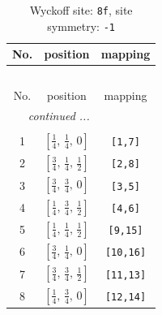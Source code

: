 \documentclass[fleqn,8pt]{jsarticle}
\begin{document}
\begin{longtable}{ccc}
\caption{Wyckoff site: {\tt 8f}, site symmetry: {\tt -1}}
 \\
 \hline \hline
No. & position & mapping \\ \hline \endfirsthead

\multicolumn{2}{l}{\tablename\ \thetable{}} \\
 \hline \hline
No. & position & mapping \\ \hline \endhead

 \hline \hline
\multicolumn{2}{r}{\footnotesize\it continued ...} \\ \endfoot

 \hline \hline
\multicolumn{2}{r}{} \\ \endlastfoot

1 & $\left[ \frac{1}{4},\, \frac{1}{4},\, 0 \right]$ & {\tt [1,7]} \\ \hline
2 & $\left[ \frac{3}{4},\, \frac{1}{4},\, \frac{1}{2} \right]$ & {\tt [2,8]} \\ \hline
3 & $\left[ \frac{3}{4},\, \frac{3}{4},\, 0 \right]$ & {\tt [3,5]} \\ \hline
4 & $\left[ \frac{1}{4},\, \frac{3}{4},\, \frac{1}{2} \right]$ & {\tt [4,6]} \\ \hline
5 & $\left[ \frac{1}{4},\, \frac{1}{4},\, \frac{1}{2} \right]$ & {\tt [9,15]} \\ \hline
6 & $\left[ \frac{3}{4},\, \frac{1}{4},\, 0 \right]$ & {\tt [10,16]} \\ \hline
7 & $\left[ \frac{3}{4},\, \frac{3}{4},\, \frac{1}{2} \right]$ & {\tt [11,13]} \\ \hline
8 & $\left[ \frac{1}{4},\, \frac{3}{4},\, 0 \right]$ & {\tt [12,14]} \\
\end{longtable}
\renewcommand{\arraystretch}{1.2}
\end{document}
